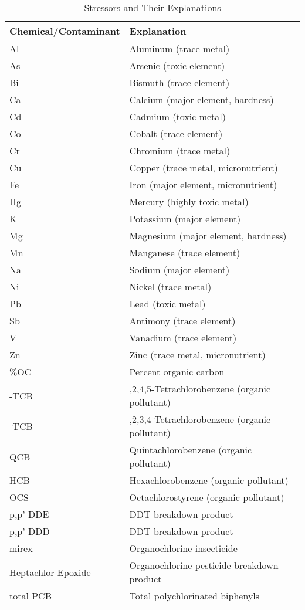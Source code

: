 \begin{table}[htbp]
\centering
\caption{Stressors and Their Explanations}
\label{tab:stressors}
\renewcommand{\arraystretch}{1.3}
\begin{tabular}{|>{\centering\arraybackslash}m{3.5cm}|>{\centering\arraybackslash}m{8.5cm}|}
\hline
\textbf{Chemical/Contaminant} & \textbf{Explanation} \\
\hline
Al & Aluminum (trace metal) \\
As & Arsenic (toxic element) \\
Bi & Bismuth (trace element) \\
Ca & Calcium (major element, hardness) \\
Cd & Cadmium (toxic metal) \\
Co & Cobalt (trace element) \\
Cr & Chromium (trace metal) \\
Cu & Copper (trace metal, micronutrient) \\
Fe & Iron (major element, micronutrient) \\
Hg & Mercury (highly toxic metal) \\
K & Potassium (major element) \\
Mg & Magnesium (major element, hardness) \\
Mn & Manganese (trace element) \\
Na & Sodium (major element) \\
Ni & Nickel (trace metal) \\
Pb & Lead (toxic metal) \\
Sb & Antimony (trace element) \\
V & Vanadium (trace element) \\
Zn & Zinc (trace metal, micronutrient) \\
\%OC & Percent organic carbon \\
1245-TCB & 1,2,4,5-Tetrachlorobenzene (organic pollutant) \\
1234-TCB & 1,2,3,4-Tetrachlorobenzene (organic pollutant) \\
QCB & Quintachlorobenzene (organic pollutant) \\
HCB & Hexachlorobenzene (organic pollutant) \\
OCS & Octachlorostyrene (organic pollutant) \\
p,p'-DDE & DDT breakdown product \\
p,p'-DDD & DDT breakdown product \\
mirex & Organochlorine insecticide \\
Heptachlor Epoxide & Organochlorine pesticide breakdown product \\
total PCB & Total polychlorinated biphenyls \\
\hline
\end{tabular}
\end{table}

